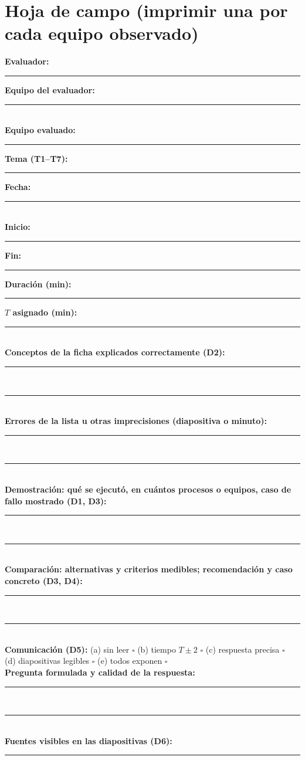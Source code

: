\documentclass[11pt,a4paper]{article}
\begin{document}
\section{Hoja de campo (imprimir una por cada equipo observado)}\label{sec:hoja}

\begin{tcolorbox}[enhanced,colback=uteqSoft,colframe=uteqBlue,boxrule=0.8pt,arc=2pt,title={\bfseries Hoja de campo --- Coevaluación de exposiciones ISR-701},left=6pt,right=6pt]
	\small
	\textbf{Evaluador:}~\rule{6.0cm}{0.4pt}\hfill\textbf{Equipo del evaluador:}~\rule{3.2cm}{0.4pt}\\[8pt]
	\textbf{Equipo evaluado:}~\rule{4.6cm}{0.4pt}\hfill\textbf{Tema (T1--T7):}~\rule{1.4cm}{0.4pt}\hfill\textbf{Fecha:}~\rule{2.2cm}{0.4pt}\\[8pt]
	\textbf{Inicio:}~\rule{1.8cm}{0.4pt}\hfill\textbf{Fin:}~\rule{1.8cm}{0.4pt}\hfill\textbf{Duración (min):}~\rule{1.5cm}{0.4pt}\hfill\textbf{$T$ asignado (min):}~\rule{1.3cm}{0.4pt}\\[8pt]
	\textbf{Conceptos de la ficha explicados correctamente (D2):}\\[4pt]
	\rule{\linewidth}{0.4pt}\\[10pt]
	\rule{\linewidth}{0.4pt}\\[6pt]
	\textbf{Errores de la lista u otras imprecisiones (diapositiva o minuto):}\\[4pt]
	\rule{\linewidth}{0.4pt}\\[10pt]
	\rule{\linewidth}{0.4pt}\\[6pt]
	\textbf{Demostración: qué se ejecutó, en cuántos procesos o equipos, caso de fallo mostrado (D1, D3):}\\[4pt]
	\rule{\linewidth}{0.4pt}\\[10pt]
	\rule{\linewidth}{0.4pt}\\[6pt]
	\textbf{Comparación: alternativas y criterios medibles; recomendación y caso concreto (D3, D4):}\\[4pt]
	\rule{\linewidth}{0.4pt}\\[10pt]
	\rule{\linewidth}{0.4pt}\\[6pt]
	\textbf{Comunicación (D5):} \quad (a) sin leer $\square$ \quad (b) tiempo $T\pm2$ $\square$ \quad (c) respuesta precisa $\square$\\[3pt]
	\hspace*{3.3cm}(d) diapositivas legibles $\square$ \quad (e) todos exponen $\square$\\[6pt]
	\textbf{Pregunta formulada y calidad de la respuesta:}\\[4pt]
	\rule{\linewidth}{0.4pt}\\[10pt]
	\rule{\linewidth}{0.4pt}\\[6pt]
	\textbf{Fuentes visibles en las diapositivas (D6):}\\[4pt]
	\rule{\linewidth}{0.4pt}\\[8pt]


\end{tcolorbox}
\end{document}
